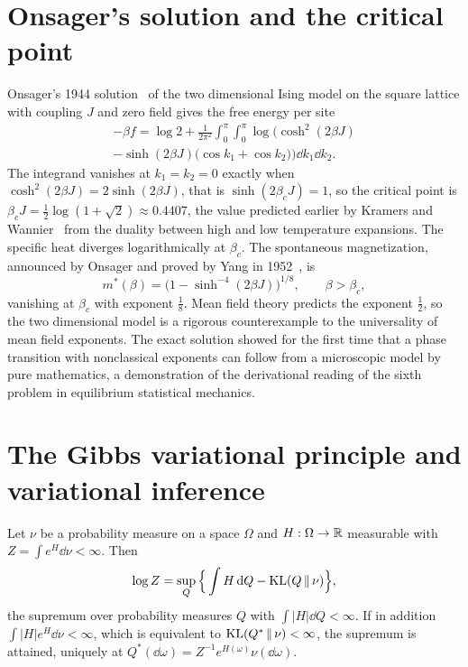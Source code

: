 \section{Onsager's solution and the critical point}\label{sec:onsager}

Onsager's 1944 solution~\cite{onsager1944} of the two dimensional Ising model on the square lattice with coupling $J$ and zero field gives the free energy per site
\[
\begin{multlined}-\beta f = \log2+\frac{1}{2\pi^2}\int_0^\pi\!\!\int_0^\pi\log\Big(\cosh^2(2\beta J)\\ -\sinh(2\beta J)\big(\cos k_1+\cos k_2\big)\Big)\dd k_1\dd k_2.\end{multlined}
\]
The integrand vanishes at $k_1 = k_2 = 0$ exactly when $\cosh^2(2\beta J) = 2\sinh(2\beta J)$, that is $\sinh(2\beta_cJ) = 1$, so the critical point is $\beta_cJ = \frac12\log(1+\sqrt2)\approx0.4407$, the value predicted earlier by Kramers and Wannier~\cite{kramers1941} from the duality between high and low temperature expansions. The specific heat diverges logarithmically at $\beta_c$. The spontaneous magnetization, announced by Onsager and proved by Yang in 1952~\cite{yang1952}, is
\[
m^*(\beta) = \big(1-\sinh^{-4}(2\beta J)\big)^{1/8},\qquad\beta>\beta_c,
\]
vanishing at $\beta_c$ with exponent $\frac18$. Mean field theory predicts the exponent $\frac12$, so the two dimensional model is a rigorous counterexample to the universality of mean field exponents. The exact solution showed for the first time that a phase transition with nonclassical exponents can follow from a microscopic model by pure mathematics, a demonstration of the derivational reading of the sixth problem in equilibrium statistical mechanics.

\section{The Gibbs variational principle and variational inference}

\begin{theorem}
Let $\nu$ be a probability measure on a space $\Omega$ and $H:\Omega\to\mathbb{R}$ measurable with $Z = \int e^{H}\dd\nu<\infty$. Then
\[
\log Z = \sup_Q\Big\{\int H\,\mathrm{d} Q-\mathrm{KL}(Q\,\|\,\nu)\Big\},
\]
the supremum over probability measures $Q$ with $\int|H|\dd Q<\infty$. If in addition $\int|H|e^{H}\dd\nu<\infty$, which is equivalent to $\mathrm{KL}(Q^*\,\|\,\nu)<\infty$, the supremum is attained, uniquely at $Q^*(\dd\omega) = Z^{-1}e^{H(\omega)}\nu(\dd\omega)$.
\end{theorem}

